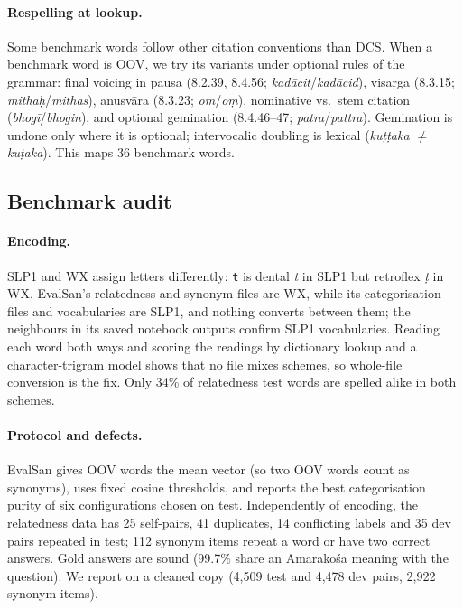 \documentclass[11pt]{article}
\begin{document}
\paragraph{Respelling at lookup.} Some benchmark words follow other citation
conventions than DCS. When a benchmark word is OOV, we try its variants
under optional rules of the grammar: final voicing in pausa (8.2.39,
8.4.56; \emph{kadācit}/\emph{kadācid}), visarga (8.3.15;
\emph{mithaḥ}/\emph{mithas}), anusvāra (8.3.23; \emph{om}/\emph{oṃ}),
nominative vs.\ stem citation (\emph{bhogī}/\emph{bhogin}), and optional
gemination (8.4.46--47; \emph{patra}/\emph{pattra}). Gemination is undone
only where it is optional; intervocalic doubling is lexical
(\emph{kuṭṭaka} $\neq$ \emph{kuṭaka}). This maps 36 benchmark words.

\subsection{Benchmark audit}\label{sec:audit}
\paragraph{Encoding.} SLP1 and WX assign letters differently: \texttt{t} is
dental \emph{t} in SLP1 but retroflex \emph{ṭ} in WX. EvalSan's
relatedness and synonym files are WX, while its categorisation files and
vocabularies are SLP1, and nothing converts between them; the neighbours in
its saved notebook outputs confirm SLP1 vocabularies. Reading each word both
ways and scoring the readings by dictionary lookup and a character-trigram
model shows that no file mixes schemes, so whole-file conversion is the fix.
Only 34\% of relatedness test words are spelled alike in both schemes.

\paragraph{Protocol and defects.} EvalSan gives OOV words the mean vector
(so two OOV words count as synonyms), uses fixed cosine thresholds, and
reports the best categorisation purity of six configurations chosen on test.
Independently of encoding, the relatedness data has 25 self-pairs, 41
duplicates, 14 conflicting labels and 35 dev pairs repeated in test; 112
synonym items repeat a word or have two correct answers. Gold answers are
sound (99.7\% share an Amarakośa meaning with the question). We report on a
cleaned copy (4,509 test and 4,478 dev pairs, 2,922 synonym items).
\end{document}
